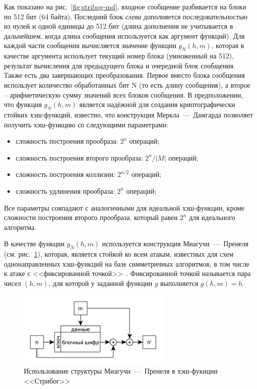 Как показано на рис.~\ref{fig:stribog-md}, входное сообщение разбивается на блоки по 512 бит (64 байта). Последний блок \emph{слева} дополняется последовательностью из нулей и  одной единицы до 512 бит (длина дополнения не учитывается в дальнейшем, когда длина сообщения используется как аргумент функций). Для каждой части сообщения вычисляется значение функции $g_N(h, m)$, которая в качестве аргумента использует текущий номер блока (умноженный на 512), результат вычисления для предыдущего блока и очередной блок сообщения. Также есть два завершающих преобразования. Первое вместо блока сообщения использует количество обработанных бит N (то есть длину сообщения), а второе -- арифметическую сумму значений всех блоков сообщения. В предположении, что функция $g_N(h, m)$ является надёжной для создания криптографически стойких хэш-функций, известно, что конструкция Меркла~---~Дамгарда позволяет получить хэш-функцию со следующими параметрами:

\begin{itemize}
	\item сложность построения прообраза: $2^n$ операций;
	\item сложность построения второго прообраза: $2^n / \left|M\right|$ операций;
	\item сложность построения коллизии: $2^{n/2}$ операций;
	\item сложность удлинения прообраза: $2^n$ операций;
\end{itemize}

Все параметры совпадают с аналогичными для идеальной хэш-функции, кроме сложности построения второго прообраза, который равен $2^n$ для идеального алгоритма.

В качестве функции $g_N(h, m)$ используется конструкция Миагучи~---~Пренеля (см. рис.~\ref{fig:stribog-mp}), которая, является стойкой ко всем атакам, известных для схем однонаправленных хэш-функций на базе симметричных алгоритмов, в том числе к атаке с <<фиксированной точкой>>~\cite[стр. 502]{Schneier:2002}. Фиксированной точкой называется пара чисел $(h, m)$, для которой у заданной функции $g$ выполняется $g(h, m) = h$.

\begin{figure}[htb]
	\centering
	\includegraphics[width=0.66\textwidth]{pic/stribog-mp}
  \caption{Использование структуры Миагучи~---~Пренеля в хэш-фукнции <<Стрибог>>}
  \label{fig:stribog-mp}
\end{figure}

